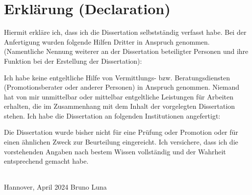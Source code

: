 
\chapter*{Erklärung (Declaration)}


Hiermit erkläre ich, dass ich die Dissertation \emph{\dissTitle} selbstständig verfasst habe. 
Bei der Anfertigung wurden folgende Hilfen Dritter in Anspruch genommen. 
(Namentliche Nennung weiterer an der Dissertation beteiligter Personen und ihre Funktion bei der Erstellung der Dissertation):

Ich habe keine entgeltliche Hilfe von Vermittlungs- bzw. Beratungsdiensten (Promotionsberater oder anderer Personen) in Anspruch genommen. 
Niemand hat von mir unmittelbar oder mittelbar entgeltliche Leistungen für Arbeiten erhalten, die im Zusammenhang mit dem Inhalt der vorgelegten Dissertation stehen. Ich habe die Dissertation an folgenden Institutionen angefertigt:

Die Dissertation wurde bisher nicht für eine Prüfung oder Promotion oder für einen ähnlichen Zweck zur Beurteilung eingereicht. 
Ich versichere, dass ich die vorstehenden Angaben nach bestem Wissen vollständig und der Wahrheit entsprechend gemacht habe.

\mbox{}\vspace{4\baselineskip}\\

Hannover, April 2024 \hfill Bruno Luna
\clearpage\mbox{}\thispagestyle{empty}

